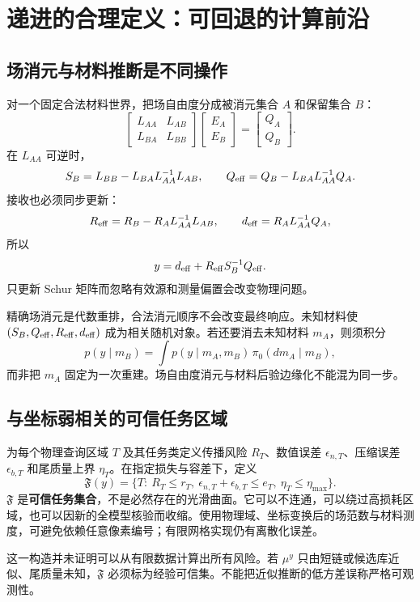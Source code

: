 \section{递进的合理定义：可回退的计算前沿}
\subsection{场消元与材料推断是不同操作}
对一个固定合法材料世界，把场自由度分成被消元集合 $A$ 和保留集合 $B$：
\[
\begin{bmatrix}L_{AA}&L_{AB}\\L_{BA}&L_{BB}\end{bmatrix}
\begin{bmatrix}E_A\\E_B\end{bmatrix}
=\begin{bmatrix}Q_A\\Q_B\end{bmatrix}.
\]
在 $L_{AA}$ 可逆时，
\[
S_B=L_{BB}-L_{BA}L_{AA}^{-1}L_{AB},\qquad
Q_{\rm eff}=Q_B-L_{BA}L_{AA}^{-1}Q_A.
\]
接收也必须同步更新：
\[
R_{\rm eff}=R_B-R_A L_{AA}^{-1}L_{AB},\qquad
d_{\rm eff}=R_A L_{AA}^{-1}Q_A,
\]
所以
\[
y=d_{\rm eff}+R_{\rm eff}S_B^{-1}Q_{\rm eff}.
\]
只更新 Schur 矩阵而忽略有效源和测量偏置会改变物理问题。

精确场消元是代数重排，合法消元顺序不会改变最终响应。未知材料使
$(S_B,Q_{\rm eff},R_{\rm eff},d_{\rm eff})$ 成为相关随机对象。若还要消去未知材料 $m_A$，则须积分
\[
p(y\mid m_B)=\int p(y\mid m_A,m_B)\,\pi_0(dm_A\mid m_B),
\]
而非把 $m_A$ 固定为一次重建。场自由度消元与材料后验边缘化不能混为同一步。

\subsection{与坐标弱相关的可信任务区域}
为每个物理查询区域 $T$ 及其任务类定义传播风险 $R_T$、数值误差 $\epsilon_{n,T}$、压缩误差 $\epsilon_{b,T}$ 和尾质量上界 $\eta_T$。在指定损失与容差下，定义
\[
\mathfrak F(y)=
\{T:\ R_T\le r_T,\ 
\epsilon_{n,T}+\epsilon_{b,T}\le e_T,\ 
\eta_T\le\eta_{\max}\}.
\]
$\mathfrak F$ 是\textbf{可信任务集合}，不是必然存在的光滑曲面。它可以不连通，可以绕过高损耗区域，也可以因新的全模型核验而收缩。使用物理域、坐标变换后的场范数与材料测度，可避免依赖任意像素编号；有限网格实现仍有离散化误差。

这一构造并未证明可以从有限数据计算出所有风险。若 $\mu^y$ 只由短链或候选库近似、尾质量未知，$\mathfrak F$ 必须标为经验可信集。不能把近似推断的低方差误称严格可观测性。

